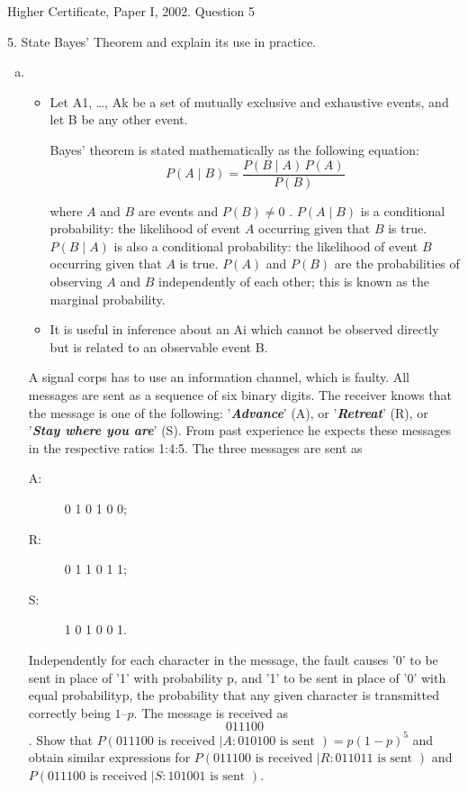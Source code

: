 \documentclass[a4paper,12pt]{article}
\begin{document}
Higher Certificate, Paper I, 2002. Question 5
\begin{framed}
5. State Bayes' Theorem and explain its use in practice.
\end{framed}
\begin{enumerate}[(a)]
    \item 
\begin{itemize}
\item Let A1, …, Ak be a set of mutually exclusive and exhaustive events, and let B be any
other event.

Bayes' theorem is stated mathematically as the following equation:
\[ {\displaystyle P(A\mid B)={\frac {P(B\mid A)\,P(A)}{P(B)}}} \]
 
where 
${\displaystyle A}$ 
 and 
${\displaystyle B}$ 
 are events and 
${\displaystyle P(B)\neq 0}$ 
. 
${\displaystyle P(A\mid B)}$ 
 is a conditional probability: the likelihood of event 
${\displaystyle A}$ 
 occurring given that 
${\displaystyle B}$ 
 is true.
$ {\displaystyle P(B\mid A)} $
 is also a conditional probability: the likelihood of event 
 $ {\displaystyle B} $ occurring given that 
 ${\displaystyle A}$ 
 is true.
${\displaystyle P(A)} $
 and 
${\displaystyle P(B)} $
 are the probabilities of observing 
$ {\displaystyle A} $
 and 
 ${\displaystyle B}$ 
 independently of each other; this is known as the marginal probability.

\item It is useful in inference about an Ai which cannot be observed directly but is related to
an observable event B.
\end{itemize}


\begin{framed}
A signal corps has to use an information channel, which is faulty. All messages
are sent as a sequence of six binary digits. The receiver knows that the message is
one of the following: '\textbf{\textit{Advance}}' (A), or '\textbf{\textit{Retreat}}' (R), or '\textbf{\textit{Stay where you are}}' (S).
From past experience he expects these messages in the respective ratios 1:4:5.
The three messages are sent as
\begin{description}
\item[A:] 0 1 0 1 0 0; 
\item[R:] 0 1 1 0 1 1; 
\item[S:] 1 0 1 0 0 1.
\end{description}

Independently for each character in the message, the fault causes '0' to be sent in
place of '1' with probability p, and '1' to be sent in place of '0' with equal
probability$ $p, the probability that any given character is transmitted correctly
being $1 – p$. The message is received as \[0 1 1 1 0 0\]. Show that
$P(011100 \mbox{ is received } | A: 010100 \mbox{ is sent } ) = p(1− p)^5$
and obtain similar expressions for
$P(011100 \mbox{ is received } | R: 011011 \mbox{ is sent })$
and
$P(011100 \mbox{ is received } | S: 101001 \mbox{ is sent })$.
\end{framed}




\end{enumerate}
\end{document}
